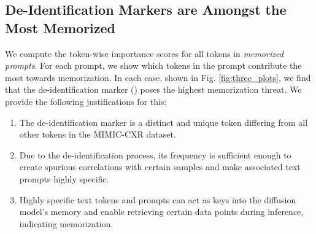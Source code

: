 \subsection{De-Identification Markers are Amongst the Most Memorized}

We compute the token-wise importance scores for all tokens in \textit{memorized prompts}. For each prompt, we show which tokens in the prompt contribute the most towards memorization. In each case, shown in Fig. \ref{fig:three_plots}, we find that the de-identification marker (\textunderscore\textunderscore\textunderscore) poses the highest memorization threat. We provide the following justifications for this:

\begin{enumerate}
    \item The de-identification marker is a distinct and unique token differing from all other tokens in the MIMIC-CXR dataset.
    \item Due to the de-identification process, its frequency is sufficient enough to create spurious correlations with certain samples and make associated text prompts highly specific.
    \item Highly specific text tokens and prompts can act as keys into the diffusion model's memory and enable retrieving certain data points during inference, indicating memorization.
\end{enumerate}

